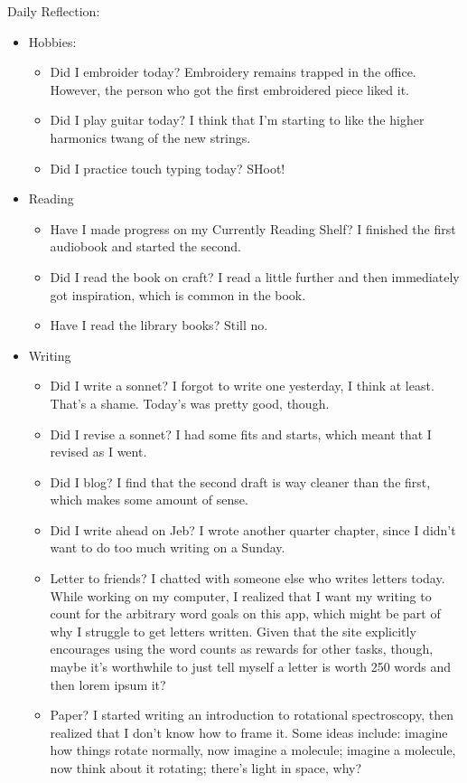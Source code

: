 \documentclass[12pt]{article}[titlepage]
\newcommand{\1}{\={a}}
\newcommand{\2}{\={e}}
\newcommand{\3}{\={\i}}
\newcommand{\4}{\=o}
\newcommand{\5}{\=u}
\newcommand{\6}{\={A}}
\renewcommand{\,}{\textsuperscript{,}}
\begin{document}
Daily Reflection:
\begin{itemize}
\item Hobbies:
\begin{itemize}
\item Did I embroider today? Embroidery remains trapped in the office. However, the person who got the first embroidered piece liked it.
\item Did I play guitar today? I think that I'm starting to like the higher harmonics twang of the new strings.
\item Did I practice touch typing today? SHoot!
\end{itemize}
\item Reading
\begin{itemize}
\item Have I made progress on my Currently Reading Shelf? I finished the first audiobook and started the second.
\item Did I read the book on craft? I read a little further and then immediately got inspiration, which is common in the book.
\item Have I read the library books? Still no.
\end{itemize}
\item Writing
\begin{itemize}
\item Did I write a sonnet? I forgot to write one yesterday, I think at least. That's a shame. Today's was pretty good, though.
\item Did I revise a sonnet? I had some fits and starts, which meant that I revised as I went.
\item Did I blog? I find that the second draft is way cleaner than the first, which makes some amount of sense.
\item Did I write ahead on Jeb? I wrote another quarter chapter, since I didn't want to do too much writing on a Sunday.
\item Letter to friends? I chatted with someone else who writes letters today. While working on my computer, I realized that I want my writing to count for the arbitrary word goals on this app, which might be part of why I struggle to get letters written. Given that the site explicitly encourages using the word counts as rewards for other tasks, though, maybe it's worthwhile to just tell myself a letter is worth 250 words and then lorem ipsum it?
\item Paper? I started writing an introduction to rotational spectroscopy, then realized that I don't know how to frame it. Some ideas include: imagine how things rotate normally, now imagine a molecule; imagine a molecule, now think about it rotating; there's light in space, why?

\end{itemize}
\end{itemize}
\end{document}
